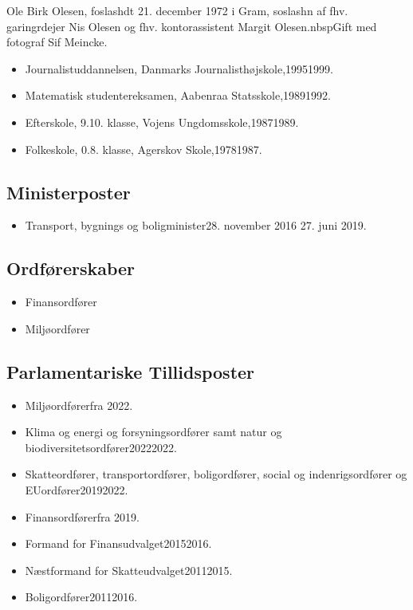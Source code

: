 \documentclass[11pt, a4paper]{awesome-cv}
\begin{document}
\makecvheader[R]
\makelettertitle
\begin{cvletter}
Ole Birk Olesen, foslashdt 21. december 1972 i Gram, soslashn af fhv. garingrdejer Nis Olesen og fhv. kontorassistent Margit Olesen.nbspGift med fotograf Sif Meincke.

\begin{itemize}
\item Journalistuddannelsen, Danmarks Journalisthøjskole,19951999.
\item Matematisk studentereksamen, Aabenraa Statsskole,19891992.
\item Efterskole, 9.10. klasse, Vojens Ungdomsskole,19871989.
\item Folkeskole, 0.8. klasse, Agerskov Skole,19781987.
\end{itemize}
\subsection*{Ministerposter}
\begin{itemize}
\item Transport, bygnings og boligminister28. november 2016  27. juni 2019.
\end{itemize}
\subsection*{Ordførerskaber}
\begin{itemize}
\item Finansordfører
\item Miljøordfører
\end{itemize}
\subsection*{Parlamentariske Tillidsposter}
\begin{itemize}
\item Miljøordførerfra 2022.
\item Klima og energi og forsyningsordfører samt natur og biodiversitetsordfører20222022.
\item Skatteordfører, transportordfører, boligordfører, social og indenrigsordfører og EUordfører20192022.
\item Finansordførerfra 2019.
\item Formand for Finansudvalget20152016.
\item Næstformand for Skatteudvalget20112015.
\item Boligordfører20112016.
\end{itemize}

\end{cvletter}
\end{document}
